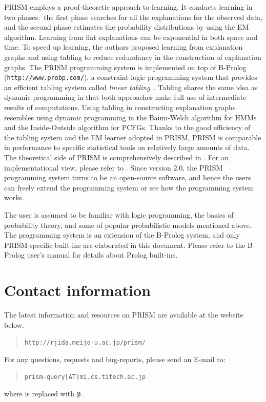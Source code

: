 \documentclass[a4paper]{report}
\makeatletter
\let\tts@ve\tt
\def\tt{\tts@ve\ifmmode\def\_{\mathchar`\_}\else\def\_{\char`\_}\fi}
\makeatother
\begin{document}
PRISM employs a proof-theoretic approach to learning. It conducts learning
in two phases:\ the first phase searches for all the explanations for the
observed data, and the second phase estimates the probability distributions
by using the EM algorithm. Learning from flat explanations can be
exponential in both space and time. To speed up learning, the authors
proposed learning from explanation graphs and using tabling to reduce
redundancy in the construction of explanation graphs.  The PRISM programming
system is implemented on top of B-Prolog ({\tt http://www.probp.com/}),
a constraint logic programming system that provides
an efficient tabling system called {\em linear tabling}~\cite{Zhou03b}.
Tabling shares the same idea as dynamic programming in that
both approaches make full use of intermediate
results of computations. Using tabling in constructing explanation graphs
resembles using dynamic programming in the Baum-Welch algorithm for HMMs  and
the Inside-Outside algorithm for PCFGs. Thanks to the good efficiency of
the tabling system and the EM learner adopted in PRISM, PRISM is comparable
in performance to specific statistical tools on relatively large amounts of
data.  The theoretical side of PRISM is comprehensively described in
\cite{Sato01b}.  For an implementational view, please refer to \cite{Zhou03a}.
Since version 2.0, the PRISM programming system turns to be an open-source
software, and hence the users can freely extend the programming system or
see how the programming system works.

The user is assumed to be familiar with logic programming, the basics of
probability theory, and some of popular probabilistic models mentioned above.
The programming system is an extension of the B-Prolog system, and only
PRISM-specific built-ins are elaborated in this document. Please refer
to the B-Prolog user's manual for details about Prolog built-ins.

\section*{Contact information}
\label{contact}

The latest information and resources on PRISM are available at
the website below.
\begin{quote}
{\tt http://rjida.meijo-u.ac.jp/prism/}
\end{quote}
For any questions, requests and bug-reports, please send an E-mail to:
\begin{quote}
{\tt prism-query[AT]mi.cs.titech.ac.jp}
\end{quote}
where {\tt [AT]} is replaced with \verb|@|\,.
\end{document}
